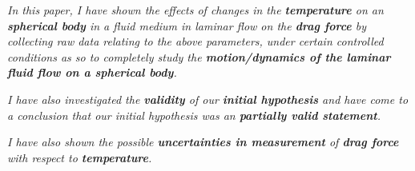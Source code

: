\textit{In this paper, I have shown the effects of changes in the \textbf{temperature} on an \textbf{spherical body} in a fluid medium in laminar flow on the \textbf{drag force} by collecting raw data relating to the above parameters, under certain controlled conditions as so to completely study the \textbf{motion/dynamics of the laminar fluid flow on a spherical body}.}

\textit{I have also investigated the \textbf{validity} of our \textbf{initial hypothesis} and have come to a conclusion that our initial hypothesis was an \textbf{partially valid statement}.}

\textit{I have also shown the possible \textbf{uncertainties in measurement} of \textbf{drag force} with respect to \textbf{temperature}.}

